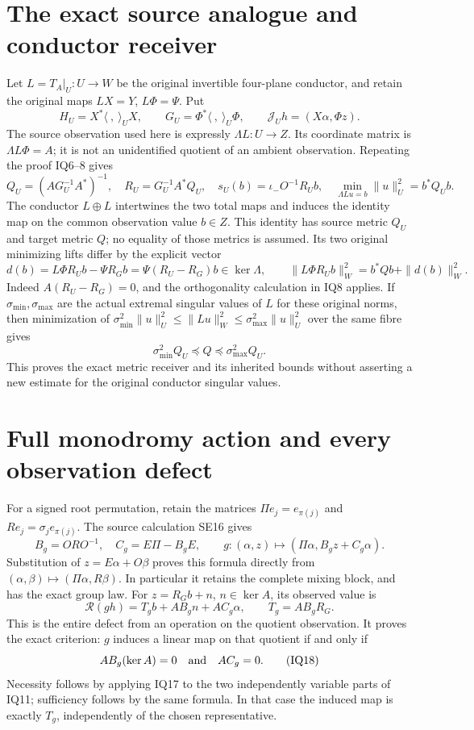 \documentclass[11pt]{article}
\begin{document}
\section{The exact source analogue and conductor receiver}
Let $L=T_A|_U:U\to W$ be the original invertible four-plane conductor,
and retain the original maps $LX=Y$, $L\Phi=\Psi$.  Put
\[
 H_U=X^*\langle\ ,\ \rangle_UX,\qquad
 G_U=\Phi^*\langle\ ,\ \rangle_U\Phi,
 \qquad\mathcal J_Uh=(X\alpha,\Phi z).               \tag{IQ12}
\]
The source observation used here is expressly $\Lambda L:U\to Z$.
Its coordinate matrix is $\Lambda L\Phi=A$; it is not an unidentified
quotient of an ambient observation.  Repeating the proof IQ6--8 gives
\[
 Q_U=(AG_U^{-1}A^*)^{-1},\quad R_U=G_U^{-1}A^*Q_U,
 \quad s_U(b)=\iota_-O^{-1}R_Ub,\quad
 \min_{\Lambda Lu=b}\|u\|_U^2=b^*Q_Ub.              \tag{IQ13}
\]
The conductor $L\oplus L$ intertwines the two total maps and induces the
identity map on the common observation value $b\in Z$.  This identity has
source metric $Q_U$ and target metric $Q$; no equality of those metrics is
assumed.  Its two original minimizing lifts differ by the explicit vector
\[
 d(b)=L\Phi R_Ub-\Psi R_Gb
     =\Psi(R_U-R_G)b\in\ker\Lambda,\qquad
 \|L\Phi R_Ub\|_W^2=b^*Qb+\|d(b)\|_W^2.            \tag{IQ14}
\]
Indeed $A(R_U-R_G)=0$, and the orthogonality calculation in IQ8 applies.
If $\sigma_{\min},\sigma_{\max}$ are the actual extremal singular values
of $L$ for these original norms, then minimization of
$\sigma_{\min}^2\|u\|_U^2\le\|Lu\|_W^2
\le\sigma_{\max}^2\|u\|_U^2$ over the same fibre gives
\[
 \sigma_{\min}^2 Q_U\preceq Q\preceq\sigma_{\max}^2 Q_U. \tag{IQ15}
\]
This proves the exact metric receiver and its inherited bounds without
asserting a new estimate for the original conductor singular values.

\section{Full monodromy action and every observation defect}
For a signed root permutation, retain the matrices
$\Pi e_j=e_{\pi(j)}$ and $Re_j=\sigma_j e_{\pi(j)}$.
The source calculation SE16 gives
\[
 B_g=ORO^{-1},\quad C_g=E\Pi-B_gE,\qquad
 g:(\alpha,z)\longmapsto(\Pi\alpha,B_gz+C_g\alpha).
                                                               \tag{IQ16}
\]
Substitution of $z=E\alpha+O\beta$ proves this formula directly from
$(\alpha,\beta)\mapsto(\Pi\alpha,R\beta)$.  In particular it retains
the complete mixing block, and has the exact group law.  For
$z=R_Gb+n$, $n\in\ker A$, its observed value is
\[
 \mathcal R(gh)=T_gb+AB_gn+AC_g\alpha,\qquad
 T_g=AB_gR_G.                                         \tag{IQ17}
\]
This is the entire defect from an operation on the quotient observation.
It proves the exact criterion: $g$ induces a linear map on that quotient
if and only if
\[
 AB_g(\ker A)=0\quad\hbox{and}\quad AC_g=0.          \tag{IQ18}
\]
Necessity follows by applying IQ17 to the two independently variable
parts of IQ11; sufficiency follows by the same formula.  In that case
the induced map is exactly $T_g$, independently of the chosen representative.
\end{document}
